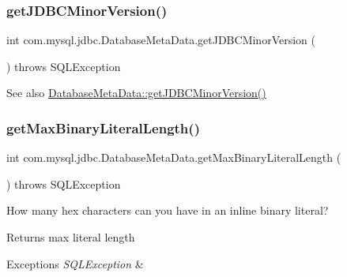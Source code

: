 \subsubsection{\texorpdfstring{get\+J\+D\+B\+C\+Minor\+Version()}{getJDBCMinorVersion()}}
{\footnotesize\ttfamily int com.\+mysql.\+jdbc.\+Database\+Meta\+Data.\+get\+J\+D\+B\+C\+Minor\+Version (\begin{DoxyParamCaption}{ }\end{DoxyParamCaption}) throws S\+Q\+L\+Exception}

\begin{DoxySeeAlso}{See also}
\mbox{\hyperlink{classcom_1_1mysql_1_1jdbc_1_1_database_meta_data_aa915d1fb8aa1d88240c8989faea490bc}{Database\+Meta\+Data\+::get\+J\+D\+B\+C\+Minor\+Version()}} 
\end{DoxySeeAlso}
\mbox{\label{classcom_1_1mysql_1_1jdbc_1_1_database_meta_data_a6df3e946caaea6c1f3a92b41ee257859}} 
\subsubsection{\texorpdfstring{get\+Max\+Binary\+Literal\+Length()}{getMaxBinaryLiteralLength()}}
{\footnotesize\ttfamily int com.\+mysql.\+jdbc.\+Database\+Meta\+Data.\+get\+Max\+Binary\+Literal\+Length (\begin{DoxyParamCaption}{ }\end{DoxyParamCaption}) throws S\+Q\+L\+Exception}

How many hex characters can you have in an inline binary literal?

\begin{DoxyReturn}{Returns}
max literal length 
\end{DoxyReturn}

\begin{DoxyExceptions}{Exceptions}
{\em S\+Q\+L\+Exception} & \\
\hline
\end{DoxyExceptions}
\mbox{\label{classcom_1_1mysql_1_1jdbc_1_1_database_meta_data_a3318249583c53777aa843eaad03ba75e}} 
